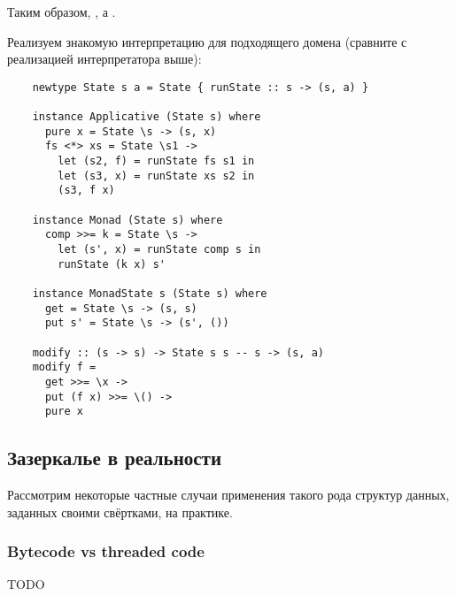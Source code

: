 Таким образом, , а .

Реализуем знакомую интерпретацию для подходящего домена (сравните с реализацией интерпретатора выше):
\begin{verbatim}
    newtype State s a = State { runState :: s -> (s, a) }

    instance Applicative (State s) where
      pure x = State \s -> (s, x)
      fs <*> xs = State \s1 ->
        let (s2, f) = runState fs s1 in
        let (s3, x) = runState xs s2 in
        (s3, f x)

    instance Monad (State s) where
      comp >>= k = State \s ->
        let (s', x) = runState comp s in
        runState (k x) s'

    instance MonadState s (State s) where
      get = State \s -> (s, s)
      put s' = State \s -> (s', ())

    modify :: (s -> s) -> State s s -- s -> (s, a)
    modify f =
      get >>= \x ->
      put (f x) >>= \() ->
      pure x
\end{verbatim}


\subsection{Зазеркалье в реальности}

Рассмотрим некоторые частные случаи применения такого рода структур данных, заданных своими свёртками, на практике.











\subsubsection{Bytecode vs threaded code} \label{subsubsec:threaded-code}

TODO %






